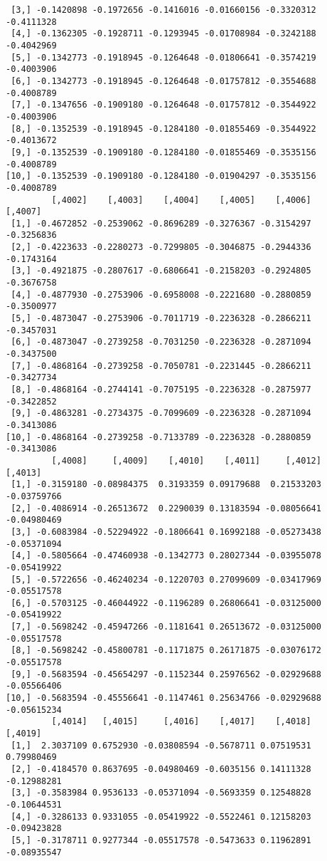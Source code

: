 \documentclass[
  letterpaper,
  DIV=11,
  numbers=noendperiod]{scrreprt}
\begin{document}
\begin{verbatim}
 [3,] -0.1420898 -0.1972656 -0.1416016 -0.01660156 -0.3320312 -0.4111328
 [4,] -0.1362305 -0.1928711 -0.1293945 -0.01708984 -0.3242188 -0.4042969
 [5,] -0.1342773 -0.1918945 -0.1264648 -0.01806641 -0.3574219 -0.4003906
 [6,] -0.1342773 -0.1918945 -0.1264648 -0.01757812 -0.3554688 -0.4008789
 [7,] -0.1347656 -0.1909180 -0.1264648 -0.01757812 -0.3544922 -0.4003906
 [8,] -0.1352539 -0.1918945 -0.1284180 -0.01855469 -0.3544922 -0.4013672
 [9,] -0.1352539 -0.1909180 -0.1284180 -0.01855469 -0.3535156 -0.4008789
[10,] -0.1352539 -0.1909180 -0.1284180 -0.01904297 -0.3535156 -0.4008789
         [,4002]    [,4003]    [,4004]    [,4005]    [,4006]    [,4007]
 [1,] -0.4672852 -0.2539062 -0.8696289 -0.3276367 -0.3154297 -0.3256836
 [2,] -0.4223633 -0.2280273 -0.7299805 -0.3046875 -0.2944336 -0.1743164
 [3,] -0.4921875 -0.2807617 -0.6806641 -0.2158203 -0.2924805 -0.3676758
 [4,] -0.4877930 -0.2753906 -0.6958008 -0.2221680 -0.2880859 -0.3500977
 [5,] -0.4873047 -0.2753906 -0.7011719 -0.2236328 -0.2866211 -0.3457031
 [6,] -0.4873047 -0.2739258 -0.7031250 -0.2236328 -0.2871094 -0.3437500
 [7,] -0.4868164 -0.2739258 -0.7050781 -0.2231445 -0.2866211 -0.3427734
 [8,] -0.4868164 -0.2744141 -0.7075195 -0.2236328 -0.2875977 -0.3422852
 [9,] -0.4863281 -0.2734375 -0.7099609 -0.2236328 -0.2871094 -0.3413086
[10,] -0.4868164 -0.2739258 -0.7133789 -0.2236328 -0.2880859 -0.3413086
         [,4008]     [,4009]    [,4010]    [,4011]     [,4012]     [,4013]
 [1,] -0.3159180 -0.08984375  0.3193359 0.09179688  0.21533203 -0.03759766
 [2,] -0.4086914 -0.26513672  0.2290039 0.13183594 -0.08056641 -0.04980469
 [3,] -0.6083984 -0.52294922 -0.1806641 0.16992188 -0.05273438 -0.05371094
 [4,] -0.5805664 -0.47460938 -0.1342773 0.28027344 -0.03955078 -0.05419922
 [5,] -0.5722656 -0.46240234 -0.1220703 0.27099609 -0.03417969 -0.05517578
 [6,] -0.5703125 -0.46044922 -0.1196289 0.26806641 -0.03125000 -0.05419922
 [7,] -0.5698242 -0.45947266 -0.1181641 0.26513672 -0.03125000 -0.05517578
 [8,] -0.5698242 -0.45800781 -0.1171875 0.26171875 -0.03076172 -0.05517578
 [9,] -0.5683594 -0.45654297 -0.1152344 0.25976562 -0.02929688 -0.05566406
[10,] -0.5683594 -0.45556641 -0.1147461 0.25634766 -0.02929688 -0.05615234
         [,4014]   [,4015]     [,4016]    [,4017]    [,4018]     [,4019]
 [1,]  2.3037109 0.6752930 -0.03808594 -0.5678711 0.07519531  0.79980469
 [2,] -0.4184570 0.8637695 -0.04980469 -0.6035156 0.14111328 -0.12988281
 [3,] -0.3583984 0.9536133 -0.05371094 -0.5693359 0.12548828 -0.10644531
 [4,] -0.3286133 0.9331055 -0.05419922 -0.5522461 0.12158203 -0.09423828
 [5,] -0.3178711 0.9277344 -0.05517578 -0.5473633 0.11962891 -0.08935547

\end{verbatim}
\end{document}
